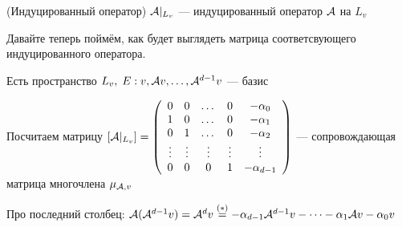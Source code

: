 \begin{conj}(Индуцированный оператор)
    $\mathcal{A} |_{L_{v}}$ --- индуцированный оператор $\mathcal{A}$ на $L_v$
\end{conj}

\vspace*{3mm}
Давайте теперь поймём, как будет выглядеть матрица соответсвующего индуцированного оператора.
\vspace*{3mm}

\begin{conj}
    Есть пространство $ L_v, \; E: v, \mathcal{A} v, \dots, \mathcal{A}^{d - 1}v $ --- базис 

    Посчитаем матрицу $[\mathcal{A} |_{L_{v}}] = 
    \left(\begin{array}{ccccc}
        0 & 0 & \dots & 0 & -\alpha_0 \\ 
        1 & 0 & \dots & 0 & -\alpha_1 \\ 
        0 & 1 & \dots & 0 & -\alpha_2 \\ 
        \vdots & \vdots & \vdots & \vdots & \vdots \\ 
        0 & 0 & 0 & 1 & -\alpha_{d - 1}
    \end{array}\right)$ --- сопровождающая матрица многочлена $\mu_{\mathcal{A}, v}$
        
    Про последний столбец: $\mathcal{A}(\mathcal{A}^{d - 1}v) = \mathcal{A}^d v \stackrel{(*)}{=} - \alpha_{d - 1} \mathcal{A}^{d - 1}v - \dots - \alpha_1 \mathcal{A} v - \alpha_0 v $
        
\end{conj}

